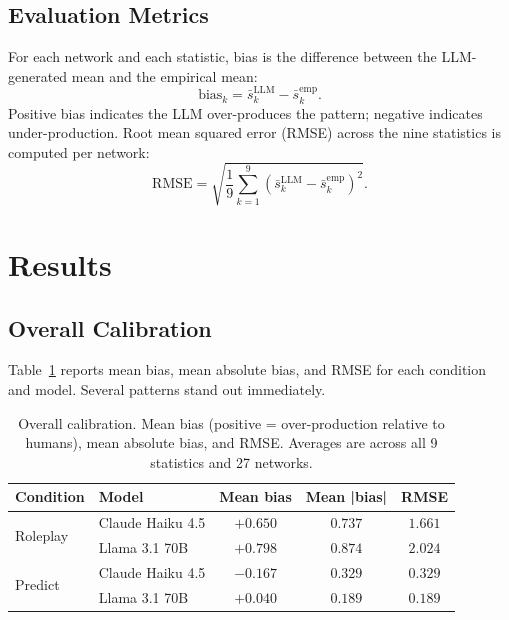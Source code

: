 \documentclass[11pt]{article}
\begin{document}
\subsection{Evaluation Metrics}

For each network and each statistic, bias is the difference between the
LLM-generated mean and the empirical mean:
\[
  \text{bias}_{k} = \bar{s}_{k}^{\text{LLM}} - \bar{s}_{k}^{\text{emp}}.
\]
Positive bias indicates the LLM over-produces the pattern; negative
indicates under-production. Root mean squared error (RMSE) across the nine
statistics is computed per network:
\[
  \text{RMSE} = \sqrt{\frac{1}{9}\sum_{k=1}^{9}
    \!\left(\bar{s}_{k}^{\text{LLM}} - \bar{s}_{k}^{\text{emp}}\right)^{\!2}}.
\]

\section{Results}
\label{sec:results}

\subsection{Overall Calibration}

Table~\ref{tab:overall} reports mean bias, mean absolute bias, and
RMSE for each condition and model. Several patterns stand out immediately.

\begin{table}[H]
\centering
\caption{Overall calibration. Mean bias (positive = over-production relative to
humans), mean absolute bias, and RMSE. Averages are across all 9 statistics
and 27 networks.}
\label{tab:overall}
\begin{tabular}{llccc}
\toprule
\textbf{Condition} & \textbf{Model} &
\textbf{Mean bias} & \textbf{Mean |bias|} & \textbf{RMSE} \\
\midrule
\multirow{2}{*}{Roleplay} &
  Claude Haiku 4.5 & $+0.650$ & $0.737$ & $1.661$ \\
& Llama 3.1 70B    & $+0.798$ & $0.874$ & $2.024$ \\
\midrule
\multirow{2}{*}{Predict} &
  Claude Haiku 4.5 & $-0.167$ & $0.329$ & $0.329$ \\
& Llama 3.1 70B    & $+0.040$ & $0.189$ & $0.189$ \\
\bottomrule
\end{tabular}
\end{table}
\end{document}
